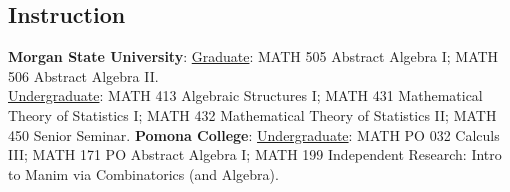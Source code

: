 \documentclass[10pt,a4paper]{article}
\newcommand{\MSU}{Morgan State University}
\newcommand{\Pomona}{Pomona College}
\begin{document}
\subsection{Instruction}
\textbf{\MSU}:
\href{https://catalog.morgan.edu/preview_program.php?catoid=27&poid=6251&returnto=1998}{Graduate}: MATH 505 Abstract Algebra I; MATH 506 Abstract Algebra II.\\
\href{https://catalog.morgan.edu/preview_program.php?catoid=26&poid=6079}{Undergraduate}: MATH 413 Algebraic Structures I; MATH 431 Mathematical Theory of Statistics I; MATH 432 Mathematical Theory of Statistics II; MATH 450 Senior Seminar. \textbf{\Pomona}:
\href{https://catalog.pomona.edu/content.php?filter%5B27%5D=MATH&filter%5B29%5D=&filter%5Bcourse_type%5D=-1&filter%5Bkeyword%5D=&filter%5B32%5D=1&filter%5Bcpage%5D=1&cur_cat_oid=43&expand=&navoid=8669&search_database=Filter&filter%5Bexact_match%5D=1#acalog_template_course_filter}{Undergraduate}: MATH PO 032 Calculs III; MATH 171 PO Abstract Algebra I; MATH 199 Independent Research: Intro to Manim via Combinatorics (and Algebra).
\end{document}
